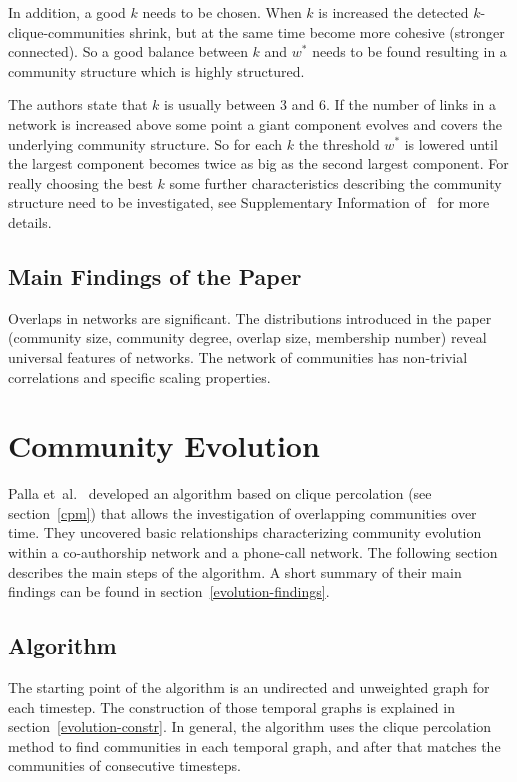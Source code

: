 \documentclass[runningheads,a4paper]{llncs}
\begin{document}
In addition, a good $k$ needs to be chosen. When $k$ is increased the detected $k$-clique-communities shrink, but at the same time become more cohesive (stronger connected).
So a good balance between $k$ and $w^*$ needs to be found resulting in a community structure which is highly structured.

The authors state that $k$ is usually between $3$ and $6$.
If the number of links in a network is increased above some point a giant component evolves and covers the underlying community structure.
So for each $k$ the threshold $w^*$ is lowered until the largest component becomes twice as big as the second largest component. For really choosing the best $k$ some further characteristics describing the community structure need to be investigated, see Supplementary Information of~\cite{palla2005uncovering} for more details.

\subsection{Main Findings of the Paper}
Overlaps in networks are significant. The distributions introduced in the paper (community size, community degree, overlap size, membership number) reveal universal features of networks. The network of communities has non-trivial correlations and specific scaling properties.~\cite{palla2005uncovering}

\section{Community Evolution}
\label{evolution}
Palla et~al.~\cite{palla2007quantifying} developed an algorithm based on clique percolation (see section~\ref{cpm}) that allows the investigation of overlapping communities over time. They uncovered basic relationships characterizing community evolution within a co-authorship network and a phone-call network. The following section describes the main steps of the algorithm. A short summary of their main findings can be found in section~\ref{evolution-findings}.

\subsection{Algorithm}
\label{evolution-algo}
The starting point of the algorithm is an undirected and unweighted graph for each timestep.
The construction of those temporal graphs is explained in section~\ref{evolution-constr}.
In general, the algorithm uses the clique percolation method to find communities in each temporal graph, and after that matches the communities of consecutive timesteps.
\end{document}
